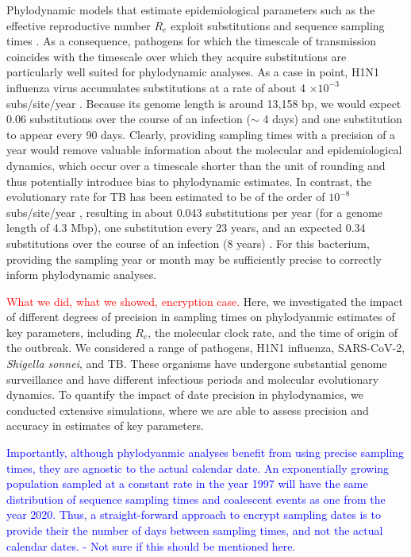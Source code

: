 \documentclass{article}
\begin{document}
\begin{spacing}{1.5}
Phylodynamic models that estimate epidemiological parameters such as the effective reproductive number $R_e$ exploit substitutions and sequence sampling times \citep{featherstone_decoding_2023}. As a consequence, pathogens for which the timescale of transmission coincides with the timescale over which they acquire substitutions are particularly well suited for phylodynamic analyses. As a case in point, H1N1 influenza virus accumulates substitutions at a rate of about 4 $\times10^{-3}$ subs/site/year \citep{hedge_2013_real-time}. Because its genome length is around 13,158 bp, we would expect 0.06 substitutions over the course of an infection ($\sim$ 4 days) and one substitution to appear every 90 days. Clearly, providing sampling times with a precision of a year would remove valuable information about the molecular and epidemiological dynamics, which occur over a timescale shorter than the unit of rounding and thus potentially introduce bias to phylodynamic estimates. In contrast, the evolutionary rate for TB has been estimated to be of the order of $10^{-8}$ subs/site/year \citep{menardo2019molecular}, resulting in about 0.043 substitutions per year (for a genome length of 4.3 Mbp), one substitution every 23 years, and an expected 0.34 substitutions over the course of an infection (8 years) \citep{kuhnert_tuberculosis_2018}. For this bacterium, providing the sampling year or month may be sufficiently precise to correctly inform phylodynamic analyses.

\textcolor{red}{What we did, what we showed, encryption case.}
Here, we investigated the impact of different degrees of precision in sampling times on phylodyanmic estimates of key parameters, including $R_e$, the molecular clock rate, and the time of origin of the outbreak. We considered a range of pathogens, H1N1 influenza, SARS-CoV-2, \textit{Shigella sonnei}, and TB. These organisms have undergone substantial genome surveillance and have different infectious periods and molecular evolutionary dynamics. To quantify the impact of date precision in phylodynamics, we conducted extensive simulations, where we are able to assess precision and accuracy in estimates of key parameters.

\textcolor{blue}{Importantly, although phylodyanmic analyses benefit from using precise sampling times, they are agnostic to the actual calendar date. An exponentially growing population sampled at a constant rate in the year 1997 will have the same distribution of sequence sampling times and coalescent events as one from the year 2020. Thus, a straight-forward approach to encrypt sampling dates is to provide their the number of days between sampling times, and not the actual calendar dates. - Not sure if this should be mentioned here.}



\end{spacing}
\end{document}
